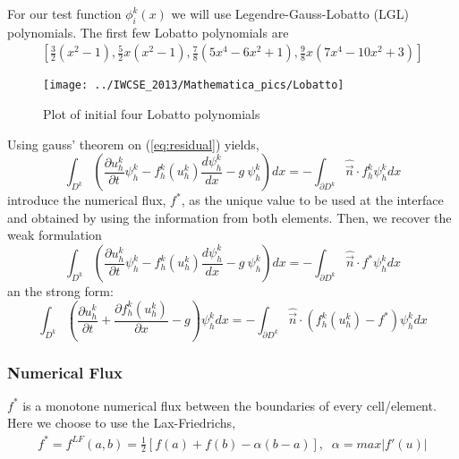 \begin{frame}
	For our test function $\phi_i^k(x)$ we will use Legendre-Gauss-Lobatto (LGL) polynomials. The first few Lobatto polynomials are
	\begin{align*}
		\left[\frac{3}{2} \left(x^2-1\right), 
		\frac{5}{2} x \left(x^2-1\right), 
		\frac{7}{8} \left(5 x^4-6 x^2+1\right), 
		\frac{9}{8} x \left(7 x^4-10 x^2+3\right)\right]
	\end{align*}
	\begin{figure}
		\centering
		\texttt{[image: ../IWCSE\_2013/Mathematica\_pics/Lobatto]}
		\caption{Plot of initial four Lobatto polynomials}
    \label{fig:Lobatto_polynomials}
	\end{figure}
\end{frame}

\begin{frame}
	Using gauss' theorem on (\ref{eq:residual}) yields,
	\begin{equation}
	\int_{D^k} \left( \frac{\partial u_h^k}{\partial t} \psi_h^k - f_h^k(u_h^k) \frac{d\psi_h^k}{dx} -g \ \psi_h^k\right) dx = 
	- \int_{\partial D^k} \hat{\vec{n}}\cdot f_h^{k} \psi_h^k dx
	\end{equation}
	introduce the numerical flux, $f^{*}$, as the unique value to be used at the interface and obtained by using the information from both elements. Then, we recover the weak formulation
	\begin{equation}
	\int_{D^k} \left( \frac{\partial u_h^k}{\partial t} \psi_h^k - f_h^k(u_h^k) \frac{d\psi_h^k}{dx} -g \ \psi_h^k\right) dx = 
	- \int_{\partial D^k} \hat{\vec{n}}\cdot f^{*} \psi_h^k dx
	\end{equation}
	an the strong form:
	\begin{equation}
	\int_{D^k} \left( \frac{\partial u_h^k}{\partial t} + \frac{\partial f_h^k(u_h^k)}{\partial x} -g\right) \psi_h^k dx = 
	-\int_{\partial D^k} \hat{\vec{n}}\cdot ( f_h^k(u_h^k) - f^{*} ) \psi_h^k dx
	\end{equation}
\end{frame}

\begin{frame} \frametitle{Numerical Flux}
	$f^{*}$ is a monotone numerical flux between the boundaries of every cell/element. 
	Here we choose to use the Lax-Friedrichs,
	\begin{align}
		f^{*} = f^{LF}(a,b) = \frac{1}{2}[f(a)+f(b)-\alpha(b-a)], \;\; \alpha=max|f'(u)|
	\end{align}
\end{frame}

